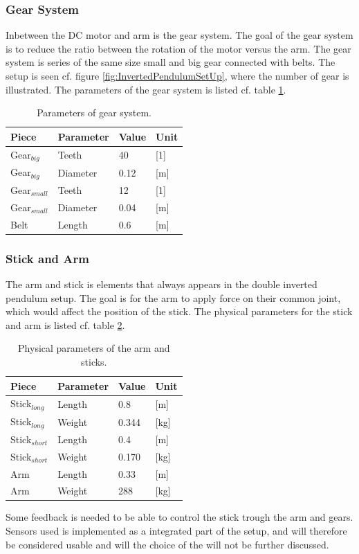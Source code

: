 	

\subsubsection{Gear System}
Inbetween the DC motor and arm is the gear system. The goal of the gear system is to reduce the ratio between the rotation of the motor versus the arm. The gear system is series of the same size small and big gear connected with belts. The setup is seen cf. figure \ref{fig:InvertedPendulumSetUp}, where the number of gear is illustrated. The parameters of the gear system is listed cf. table \ref{GearSystemParameters}.   

\begin{table}[htbp]
\centering
\begin{tabular}{llll}
\hline
Piece & Parameter & Value & Unit \\ \hline
Gear$_{big}$ & Teeth & 40 & {[}1{]} \\
Gear$_{big}$ & Diameter & 0.12 & {[}m{]} \\
Gear$_{small}$ & Teeth & 12 & {[}1{]} \\
Gear$_{small}$ & Diameter & 0.04 & {[}m{]} \\
Belt & Length & 0.6 & {[}m{]}
\end{tabular}
\caption{Parameters of gear system.}
\label{GearSystemParameters}
\end{table}

\subsubsection{Stick and Arm}
The arm and stick is elements that always appears in the double inverted pendulum setup. The goal is for the arm to apply force on their common joint, which would affect the position of the stick. The physical parameters for the stick and arm is listed cf. table \ref{DimensionsStick}.

\begin{table}[htbp]
\centering
\begin{tabular}{llll}
\hline
Piece           & Parameter & Value & Unit \\ \hline
Stick$_{long}$  & Length    & 0.8   & [m]    \\
Stick$_{long}$  & Weight    & 0.344 & [kg]    \\ 
Stick$_{short}$ & Length    & 0.4   & [m]    \\
Stick$_{short}$ & Weight    & 0.170 & [kg]    \\ 
Arm             & Length    & 0.33  & [m]    \\
Arm             & Weight    & 288   & [kg]   \\ 
\end{tabular}
\caption{Physical parameters of the arm and sticks.}
\label{DimensionsStick}
\end{table}
\newpage
Some feedback is needed to be able to control the stick trough the arm and gears. Sensors used is implemented as a integrated part of the setup, and will therefore be considered usable and will the choice of the will not be further discussed.

